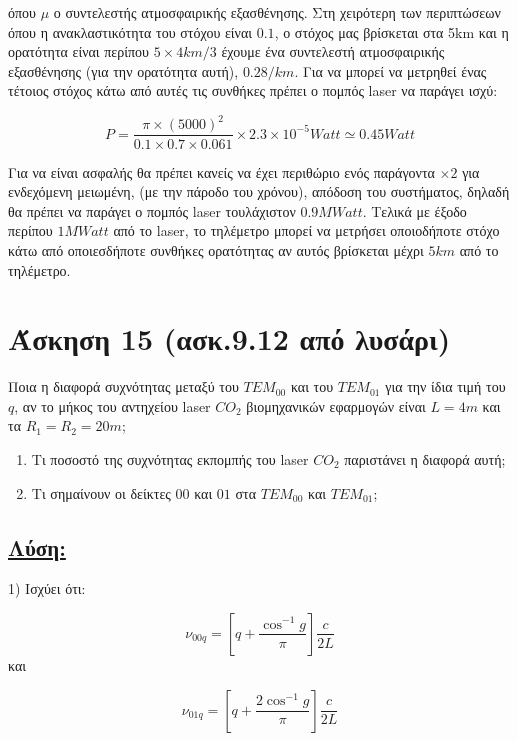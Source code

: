 \documentclass[a4paper,11pt,titlepage]{article}
\numberwithin{equation}{section} %
\begin{document}
όπου $\mu$ ο συντελεστής ατμοσφαιρικής εξασθένησης. Στη χειρότερη των περιπτώσεων όπου η ανακλαστικότητα του στόχου είναι $0.1$, ο στόχος μας βρίσκεται στα 5km και η ορατότητα είναι περίπου $5\times4km/3$ έχουμε ένα συντελεστή ατμοσφαιρικής εξασθένησης (για την ορατότητα αυτή), $0.28/km$. Για να μπορεί να μετρηθεί ένας τέτοιος στόχος κάτω από αυτές τις συνθήκες πρέπει ο πομπός laser να παράγει ισχύ:

\begin{equation}
 P=\frac{\pi\times(5000)^2}{0.1\times0.7\times0.061}\times2.3\times10^{-5}Watt\simeq0.45Watt
\end{equation}

Για να είναι ασφαλής θα πρέπει κανείς να έχει περιθώριο ενός παράγοντα $\times2$ για ενδεχόμενη μειωμένη, (με την πάροδο του χρόνου), απόδοση του συστήματος, δηλαδή θα πρέπει να παράγει ο πομπός laser τουλάχιστον $0.9MWatt$. Τελικά με έξοδο περίπου $1MWatt$ από το laser, το τηλέμετρο μπορεί να μετρήσει οποιοδήποτε στόχο κάτω από οποιεσδήποτε συνθήκες ορατότητας αν αυτός βρίσκεται μέχρι $5km$ από το τηλέμετρο.

\section{Άσκηση 15 (ασκ.9.12 από λυσάρι)}

Ποια η διαφορά συχνότητας μεταξύ του $TEM_{00}$ και του $TEM_{01}$ για την ίδια τιμή του $q$, αν το μήκος του αντηχείου laser $CO_2$ βιομηχανικών εφαρμογών είναι $L=4m$ και τα $R_1=R_2=20m$;
\begin{enumerate}
 \item Τι ποσοστό της συχνότητας εκπομπής του laser $CO_2$ παριστάνει η διαφορά αυτή;
 \item Τι σημαίνουν οι δείκτες $00$ και $01$ στα $TEM_{00}$ και $TEM_{01}$;
\end{enumerate}

\subsection*{\underline{Λύση:}}

1) Ισχύει ότι:

\begin{equation}
 \nu_{00q}=[q+\frac{\cos^{-1}g}{\pi}]\frac{c}{2L}
\end{equation}
 και 

\begin{equation}
 \nu_{01q}=[q+\frac{2\cos^{-1}g}{\pi}]\frac{c}{2L}
\end{equation}
\end{document}
